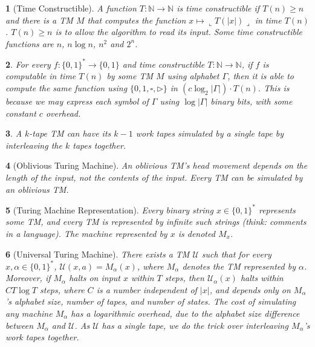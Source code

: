 \documentclass[10pt]{article}
\newtheorem{note}{}[section]
\begin{document}
\begin{note}[Time Constructible]
  A function $T: \mathbb{N} \to \mathbb{N}$ is time constructible if
  $T(n) \geq n$ and there is a TM $M$ that computes the function
  $x \mapsto \llcorner T(|x|) \lrcorner$ in time $T(n)$.
  $T(n) \geq n$ is to allow the algorithm to read its input.
  Some time constructible functions are $n$, $n \log n$, $n^2$ and $2^n$.
\end{note}

\begin{note}
  For every $f : \{0, 1\}^\ast \to \{0, 1\}$ and time constructible
  $T : \mathbb{N} \to \mathbb{N}$, if $f$ is computable in time $T(n)$ by
  some TM $M$ using alphabet $\Gamma$, then it is able to compute the same
  function using $\{0, 1, \square, \triangleright\}$ in 
  $\left(c \log_2 | \Gamma| \right) \cdot T(n)$.
  This is because we may express each symbol of $\Gamma$ using
  $\log |\Gamma|$ binary bits, with some constant $c$ overhead.
\end{note}

\begin{note}
  A $k$-tape TM can have its $k - 1$ work tapes simulated by a single tape by
  interleaving the $k$ tapes together.
\end{note}

\begin{note}[Oblivious Turing Machine]
  An oblivious TM's head movement depends on the length of the input, not
  the contents of the input.
  Every TM can be simulated by an oblivious TM.
\end{note}

\begin{note}[Turing Machine Representation]
  Every binary string $x \in \{0, 1\}^\ast$ represents some TM, and every TM
  is represented by infinite such strings (think: comments in a language).
  The machine represented by $x$ is denoted $M_x$.
\end{note}

\begin{note}[Universal Turing Machine]
  There exists a TM $\mathcal{U}$ such that for every
  $x, \alpha \in \{0, 1\}^\ast$, $\mathcal{U}(x, a) = M_\alpha (x)$, where
  $M_\alpha$ denotes the TM represented by $\alpha$.
  Moreover, if $M_\alpha$ halts on input $x$ within $T$ steps, then
  $\mathcal{U}_\alpha (x)$ halts within $C T \log T$ steps, where $C$ is
  a number independent of $|x|$, and depends only on $M_\alpha$'s alphabet
  size, number of tapes, and number of states.
  The cost of simulating any machine $M_\alpha$ has a
  logarithmic overhead, due to the alphabet size difference between
  $M_\alpha$ and $\mathcal{U}$.
  As $\mathcal{U}$ has a single tape, we do the trick over interleaving
  $M_\alpha$'s work tapes together.
\end{note}
\end{document}
